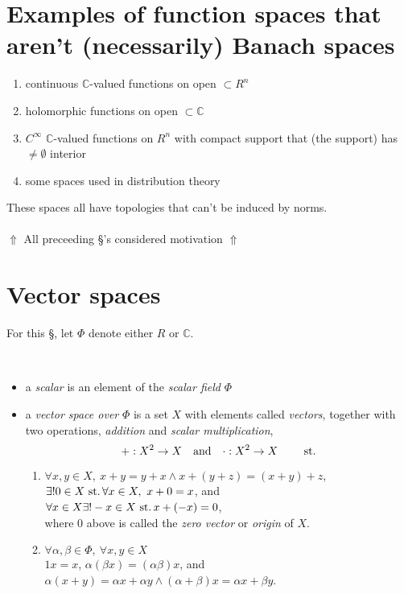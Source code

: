 \section{Examples of function spaces that aren't (necessarily) Banach spaces}

\begin{enumerate}[label=(\alph*)]
\item
  continuous $\mathbb{C}$-valued functions on open ${\subset R^n}$
\item
  holomorphic functions on open ${\subset\mathbb{C}}$
\item
  $C^\infty$ $\mathbb{C}$-valued functions on $R^n$ with compact
  support that (the support) has ${\neq\emptyset}$ interior
\item
  some spaces used in distribution theory
\end{enumerate}

These spaces all have topologies that can't be induced by norms.

\paragraph{}
{\Large
  $\Uparrow$
  All preceeding \S 's considered motivation
  $\Uparrow$
}

\pagebreak

\section{Vector spaces}
For this \S, let $\Phi$ denote either $R$ or $\mathbb{C}$.

\begin{defn}\
  \begin{itemize}
  \item
    a \emph{scalar} is an element of the \emph{scalar field} $\Phi$
  \item
    a \emph{vector space over} $\Phi$ is a set $X$
    with elements called \emph{vectors}, together with two operations,
    \emph{addition} and \emph{scalar multiplication},
    \[
    +: X^2\rightarrow X
    \quad\text{and}\quad
    \cdot: X^2\rightarrow X
    \qquad\operatorname{\,st.}
    \]
    \begin{enumerate}[label=(\alph*)]
    \item
      ${\forall x,y\in X,\ x+y=y+x\land x+(y+z)=(x+y)+z}$,\\
      ${\exists! 0\in X\st\forall x\in X,\ x+0=x}$, and\\
      ${\forall x\in X\exists! -x\in X\operatorname{\,st.} x+(-x)=0}$, \\
      where $0$ above is called the \emph{zero vector}
      or \emph{origin} of $X$.
    \item
      ${\forall\alpha,\beta\in\Phi,\ \forall x,y\in X}$\\
      ${1x=x}$, ${\alpha(\beta x)=(\alpha\beta)x}$, and \\
      ${\alpha(x+y)=\alpha x+\alpha y\land (\alpha+\beta)x=\alpha x+\beta y}$.
    \end{enumerate}
  \end{itemize}
\end{defn}

